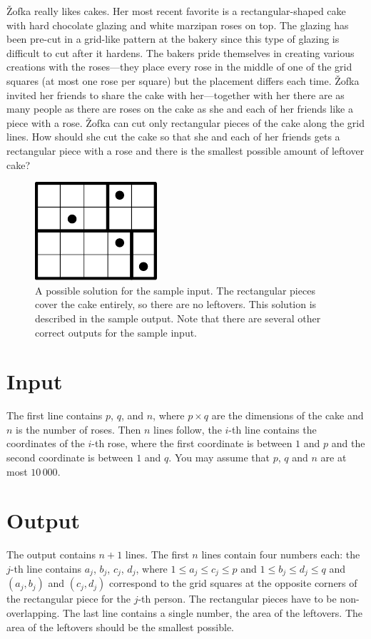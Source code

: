 
Žofka really likes cakes. Her most recent favorite is a
rectangular-shaped cake with hard chocolate glazing and white marzipan
roses on top. The glazing has been pre-cut in a grid-like pattern at
the bakery since this type of glazing is difficult to cut after it
hardens. The bakers pride themselves in creating various creations
with the roses---they place every rose in the middle of one of the
grid squares (at most one rose per square) but the placement differs
each time. Žofka invited her friends to share the cake with
her---together with her there are as many people as there are roses on
the cake as she and each of her friends like a piece with a
rose. Žofka can cut only rectangular pieces of the cake along the grid
lines.  How should she cut the cake so that she and each of her
friends gets a rectangular piece with a rose and there is the smallest
possible amount of leftover cake?

\begin{figure}[h]
  \centering
  \includegraphics{cake}
  \caption{A possible solution for the sample input. The rectangular
    pieces cover the cake entirely, so there are no leftovers. This
    solution is described in the sample output. Note that there are
    several other correct outputs for the sample input.}
\label{fig:sample1}
\end{figure}

\section*{Input}

The first line contains $p$, $q$, and $n$,
where $p \times q$ are the dimensions of the cake and $n$ is the
number of roses. Then $n$ lines follow, the $i$-th line contains the
coordinates of the $i$-th rose, where the first coordinate is between
$1$ and $p$ and the second coordinate is between $1$ and $q$. You may
assume that $p$, $q$ and $n$ are at most $10\,000$.

\section*{Output}

The output contains $n + 1$ lines. The first $n$ lines
contain four numbers each: the $j$-th line contains $a_j$, $b_j$,
$c_j$, $d_j$, where $1 \leq a_j \leq c_j \leq p$ and
$1 \leq b_j \leq d_j \leq q$ and $(a_j, b_j)$ and $(c_j, d_j)$
correspond to the grid squares at the opposite corners of the
rectangular piece for the $j$-th person. The rectangular pieces have
to be non-overlapping. The last line contains a single number, the
area of the leftovers. The area of the leftovers should be the
smallest possible.
